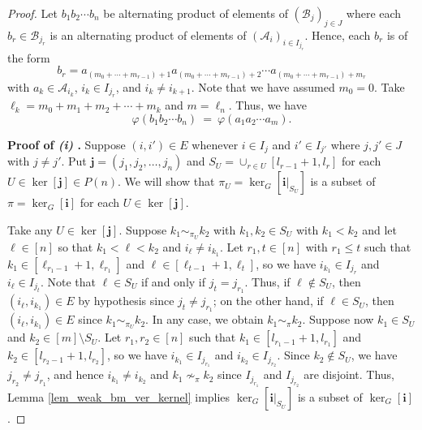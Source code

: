 \documentclass[a4paper,12pt]{extarticle}
\theoremstyle{definition}
\theoremstyle{remark}
\begin{document}
\begin{proof}
	Let $b_1 b_2 \cdots b_n$ be alternating product of elements of  $(\mathcal{B}_j)_{j \in J}$ where each $b_r \in \mathcal{B}_{j_r}$ is an alternating product of elements of $(\mathcal{A}_i)_{i \in I_{j_r}}$.   
	Hence, each $b_r$ is of the form  
	\[b_r = a_{(m_0+\cdots+m_{r-1})+1} a_{(m_0+\cdots+m_{r-1})+2}   \cdots  a_{(m_0+\cdots+m_{r-1})+m_r} \]
	with $a_k \in \mathcal{A}_{i_k}$, $i_k \in I_{j_r}$, and $i_{k} \neq i_{k+1}$.   
	Note that we have assumed $m_0=0$.  
	Take $\ell_k = m_0 + m_1 + m_2 + \cdots + m_k$ and $m=\ell_n$. 
	Thus, we have %
	$$\varphi(b_1 b_2 \cdots b_n) \ = \ \varphi( a_1 a_2 \cdots a_{m} ).$$
	
	\noindent \textbf{Proof of \emph{(i)} .} Suppose $(i,i') \in E$ whenever $i \in I_{j}$ and $i' \in I_{j'}$ where $j,j' \in J$ with $j \neq j'$. 
	Put $\bm{j}=(j_1,j_2,\ldots,j_n)$ and $S_U = \cup_{r \in U}[l_{r-1}+1,l_r]$ for each $U \in \ker[\bm{j}] \in P(n)$. 
	We will show that $\pi_U = \ker_G[\bm{i}|_{S_U}]$ is a subset of $\pi = \ker_G[\bm{i}]$ for each $U \in \ker[\bm{j}]$. 
	
	Take any $U \in \ker[\bm{j}]$.
	Suppose $k_1 \sim_{\pi_U} k_2$ with $k_1 , k_2 \in S_U$ with $k_1 < k_2$ and let $\ell \in [n]$ so that $k_1 < \ell < k_2$ and $i_{\ell} \neq i_{k_1}$.  
	Let $r_1,t \in [n]$ with $r_1 \leq t$ such that $k_1 \in [\ell_{r_1-1}+1,\ell_{r_1}]$ and  $\ell \in [\ell_{t-1}+1,\ell_t]$, so we have $i_{k_1} \in I_{j_r}$ and $i_{\ell} \in I_{j_t}$. 
	Note that $\ell \in S_{U}$ if and only if $j_t = j_{r_1}$. 
	Thus, if $\ell \notin S_U$, then $(i_\ell,i_{k_1}) \in E$ by hypothesis since $j_t \neq j_{r_1}$; on the other hand, if $\ell \in S_U$, then $(i_\ell,i_{k_1}) \in E$ since $k_1 \sim_{\pi_U} k_2$. 
	In any case, we obtain $k_1 \sim_{\pi} k_2$. 
	Suppose now $k_1 \in S_U$ and $k_2 \in [m]\setminus S_U$.
	Let $r_1, r_2 \in [n]$ such that $k_1 \in [l_{r_1-1}+1,l_{r_1}] $ and $k_2 \in [l_{r_2-1}+1,l_{r_2}]$, so we have $i_{k_1} \in I_{j_{r_1}}$ and $i_{k_2} \in I_{j_{r_2}}$. 
	Since $k_2 \notin S_U$, we have $j_{r_2} \neq j_{r_1}$, and hence $i_{k_1} \neq i_{k_2}$ and $k_1 \nsim_{\pi} k_2$ since $I_{j_{r_1}}$ and $I_{j_{r_2}}$ are disjoint. 
	Thus, Lemma \ref{lem_weak_bm_ver_kernel} implies $\ker_G[\bm{i}|_{S_U}]$ is a subset of $\ker_G[\bm{i}]$. 
	

\end{proof}
\end{document}
